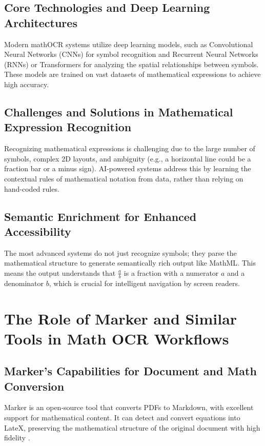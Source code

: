 \subsection{Core Technologies and Deep Learning Architectures}\label{ch11:ssec:core-tech}
Modern \gls{mathOCR} systems utilize deep learning models, such as Convolutional Neural Networks (CNNs) for symbol recognition and Recurrent Neural Networks (RNNs) or Transformers for analyzing the spatial relationships between symbols. These models are trained on vast datasets of mathematical expressions to achieve high accuracy.

\subsection{Challenges and Solutions in Mathematical Expression Recognition}\label{ch11:ssec:challenges}
Recognizing mathematical expressions is challenging due to the large number of symbols, complex 2D layouts, and ambiguity (e.g., a horizontal line could be a fraction bar or a minus sign). \gls{AI}-powered systems address this by learning the contextual rules of mathematical notation from data, rather than relying on hand-coded rules.

\subsection{Semantic Enrichment for Enhanced Accessibility}\label{ch11:ssec:semantic-enrichment}
The most advanced systems do not just recognize symbols; they parse the mathematical structure to generate semantically rich output like \gls{MathML}. This means the output understands that $\frac{a}{b}$ is a fraction with a numerator $a$ and a denominator $b$, which is crucial for intelligent navigation by screen readers.

\section{The Role of Marker and Similar Tools in Math OCR Workflows}\label{ch11:sec:marker}
\subsection{Marker's Capabilities for Document and Math Conversion}\label{ch11:ssec:marker-capabilities}
Marker is an open-source tool that converts PDFs to Markdown, with excellent support for mathematical content. It can detect and convert equations into \gls{LateX}, preserving the mathematical structure of the original document with high fidelity \supercite{Marker}.


